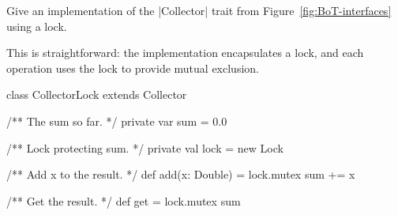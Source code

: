 \begin{questionS}
\label{ex:summer-monitor}
Give an implementation of the |Collector| trait from
Figure~\ref{fig:BoT-interfaces} using a lock.
\end{questionS}


\begin{answerS}
This is straightforward: the implementation encapsulates a lock, and each
operation uses the lock to provide mutual exclusion.
% 
\begin{scala}
class CollectorLock extends Collector{
  /** The sum so far. */
  private var sum = 0.0

  /** Lock protecting sum. */
  private val lock = new Lock

  /** Add x to the result. */
  def add(x: Double) = lock.mutex{ sum += x }

  /** Get the result. */
  def get = lock.mutex{ sum }
}
\end{scala}
\end{answerS}
